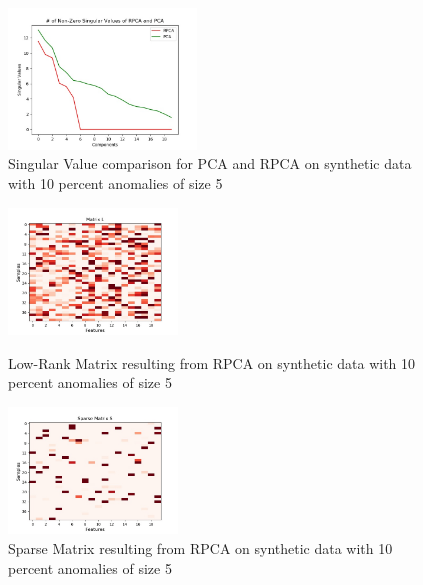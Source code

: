 \documentclass[conference]{IEEEtran}
\begin{document}
\begin{figure}[H]
    \centering
    \includegraphics[width=50mm, scale=0.5]{Singular_Value_Plot_Test_400AnomSize5.jpg}
    \caption{Singular Value comparison for PCA and RPCA on synthetic data with 10 percent anomalies of size 5}
    \label{fig:singvaltrain4005}
\end{figure}
\begin{figure}[H]
\begin{minipage}[b]{0.45\linewidth}
    \centering
    \includegraphics[width=45mm, scale=0.5]{L_400AnomSize5.jpg}
    \caption{Low-Rank Matrix resulting from RPCA on synthetic data with 10 percent anomalies of size 5}
    \label{fig:Ltrain4005}
\end{minipage}
\quad
\begin{minipage}[b]{0.45\linewidth}
    \includegraphics[width=45mm, scale=0.5]{S_400AnomSize5.jpg}
    \caption{Sparse Matrix resulting from RPCA on synthetic data with 10 percent anomalies of size 5}
    \label{fig:Strain4005}
\end{minipage}
\end{figure}
\end{document}
